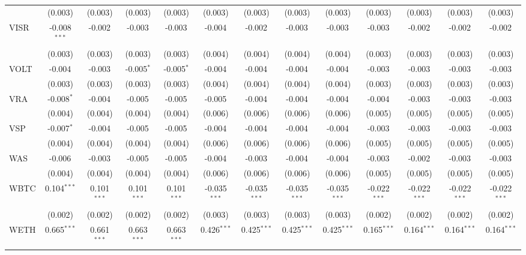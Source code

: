 \begin{table}[!htbp]
\begin{tabular}{@{\extracolsep{5pt}}lcccccccccccc}
  & (0.003) & (0.003) & (0.003) & (0.003) & (0.003) & (0.003) & (0.003) & (0.003) & (0.003) & (0.003) & (0.003) & (0.003) \\
 VISR & -0.008$^{***}$ & -0.002$^{}$ & -0.003$^{}$ & -0.003$^{}$ & -0.004$^{}$ & -0.002$^{}$ & -0.003$^{}$ & -0.003$^{}$ & -0.003$^{}$ & -0.002$^{}$ & -0.002$^{}$ & -0.002$^{}$ \\
  & (0.003) & (0.003) & (0.003) & (0.003) & (0.004) & (0.004) & (0.004) & (0.004) & (0.003) & (0.003) & (0.003) & (0.003) \\
 VOLT & -0.004$^{}$ & -0.003$^{}$ & -0.005$^{*}$ & -0.005$^{*}$ & -0.004$^{}$ & -0.004$^{}$ & -0.004$^{}$ & -0.004$^{}$ & -0.003$^{}$ & -0.003$^{}$ & -0.003$^{}$ & -0.003$^{}$ \\
  & (0.003) & (0.003) & (0.003) & (0.003) & (0.004) & (0.004) & (0.004) & (0.004) & (0.003) & (0.003) & (0.003) & (0.003) \\
 VRA & -0.008$^{*}$ & -0.004$^{}$ & -0.005$^{}$ & -0.005$^{}$ & -0.005$^{}$ & -0.004$^{}$ & -0.004$^{}$ & -0.004$^{}$ & -0.004$^{}$ & -0.003$^{}$ & -0.003$^{}$ & -0.003$^{}$ \\
  & (0.004) & (0.004) & (0.004) & (0.004) & (0.006) & (0.006) & (0.006) & (0.006) & (0.005) & (0.005) & (0.005) & (0.005) \\
 VSP & -0.007$^{*}$ & -0.004$^{}$ & -0.005$^{}$ & -0.005$^{}$ & -0.004$^{}$ & -0.004$^{}$ & -0.004$^{}$ & -0.004$^{}$ & -0.003$^{}$ & -0.003$^{}$ & -0.003$^{}$ & -0.003$^{}$ \\
  & (0.004) & (0.004) & (0.004) & (0.004) & (0.006) & (0.006) & (0.006) & (0.006) & (0.005) & (0.005) & (0.005) & (0.005) \\
 WAS & -0.006$^{}$ & -0.003$^{}$ & -0.005$^{}$ & -0.005$^{}$ & -0.004$^{}$ & -0.003$^{}$ & -0.004$^{}$ & -0.004$^{}$ & -0.003$^{}$ & -0.002$^{}$ & -0.003$^{}$ & -0.003$^{}$ \\
  & (0.004) & (0.004) & (0.004) & (0.004) & (0.006) & (0.006) & (0.006) & (0.006) & (0.005) & (0.005) & (0.005) & (0.005) \\
 WBTC & 0.104$^{***}$ & 0.101$^{***}$ & 0.101$^{***}$ & 0.101$^{***}$ & -0.035$^{***}$ & -0.035$^{***}$ & -0.035$^{***}$ & -0.035$^{***}$ & -0.022$^{***}$ & -0.022$^{***}$ & -0.022$^{***}$ & -0.022$^{***}$ \\
  & (0.002) & (0.002) & (0.002) & (0.002) & (0.003) & (0.003) & (0.003) & (0.003) & (0.002) & (0.002) & (0.002) & (0.002) \\
 WETH & 0.665$^{***}$ & 0.661$^{***}$ & 0.663$^{***}$ & 0.663$^{***}$ & 0.426$^{***}$ & 0.425$^{***}$ & 0.425$^{***}$ & 0.425$^{***}$ & 0.165$^{***}$ & 0.164$^{***}$ & 0.164$^{***}$ & 0.164$^{***}$ \\

\end{tabular}
\end{table}
